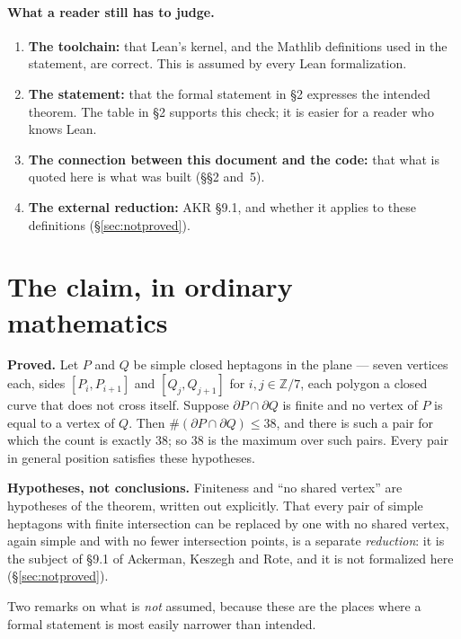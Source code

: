 \documentclass[11pt]{article}
\newenvironment{trustbox}%
  {\par\medskip\setlength{\fboxsep}{9pt}%
   \begin{lrbox}{\trustboxbuf}%
   \begin{minipage}{\dimexpr\textwidth-2\fboxsep-2\fboxrule\relax}}%
  {\end{minipage}\end{lrbox}%
   \noindent\fcolorbox{black!35}{black!4}{\usebox{\trustboxbuf}}\par\medskip}
\begin{document}
\paragraph{What a reader still has to judge.}
\begin{enumerate}
\item \textbf{The toolchain:} that Lean's kernel, and the Mathlib definitions
  used in the statement, are correct. This is assumed by every Lean
  formalization.
\item \textbf{The statement:} that the formal statement in \S2 expresses the
  intended theorem. The table in \S2 supports this check; it is easier for a
  reader who knows Lean.
\item \textbf{The connection between this document and the code:} that what
  is quoted here is what was built (\S\S2 and~5).
\item \textbf{The external reduction:} AKR \S9.1, and whether it applies to
  these definitions (\S\ref{sec:notproved}).
\end{enumerate}

\section{The claim, in ordinary mathematics}

\begin{trustbox}
\textbf{Proved.} Let $P$ and $Q$ be simple closed heptagons in the plane ---
seven vertices each, sides $[P_i,P_{i+1}]$ and $[Q_j,Q_{j+1}]$ for
$i,j\in\mathbb{Z}/7$, each polygon a closed curve that does not cross itself.
Suppose $\partial P\cap\partial Q$ is finite and no vertex of $P$ is equal to
a vertex of $Q$. Then $\#(\partial P\cap\partial Q)\le 38$, and there is such a
pair for which the count is exactly $38$; so $38$ is the maximum over such
pairs. Every pair in general position satisfies these hypotheses.

\medskip
\textbf{Hypotheses, not conclusions.} Finiteness and ``no shared vertex'' are
hypotheses of the theorem, written out explicitly. That every pair of simple
heptagons with finite intersection can be replaced by one with no shared
vertex, again simple and with no fewer intersection points, is a separate
\emph{reduction}: it is the subject of \S9.1 of Ackerman, Keszegh and Rote,
and it is not formalized here (\S\ref{sec:notproved}).
\end{trustbox}

\noindent Two remarks on what is \emph{not} assumed, because these are the
places where a formal statement is most easily narrower than intended.
\end{document}
